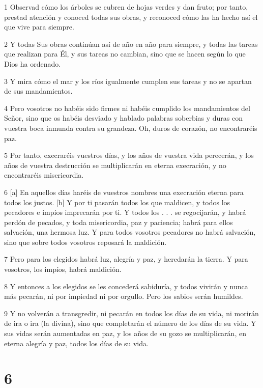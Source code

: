 \par 1 Observad cómo los árboles se cubren de hojas verdes y dan fruto; por tanto, prestad atención y conoced todas sus obras, y reconoced cómo las ha hecho así el que vive para siempre.
\par 2 Y todas Sus obras continúan así de año en año para siempre, y todas las tareas que realizan para Él, y sus tareas no cambian, sino que se hacen según lo que Dios ha ordenado.
\par 3 Y mira cómo el mar y los ríos igualmente cumplen sus tareas y no se apartan de sus mandamientos.
\par 4 Pero vosotros no habéis sido firmes ni habéis cumplido los mandamientos del Señor, sino que os habéis desviado y hablado palabras soberbias y duras con vuestra boca inmunda contra su grandeza. Oh, duros de corazón, no encontraréis paz.
\par 5 Por tanto, execraréis vuestros días, y los años de vuestra vida perecerán, y los años de vuestra destrucción se multiplicarán en eterna execración, y no encontraréis misericordia.
\par 6 [a] En aquellos días haréis de vuestros nombres una execración eterna para todos los justos. [b] Y por ti pasarán todos los que maldicen, y todos los pecadores e impíos imprecarán por ti. Y todos los . . . se regocijarán, y habrá perdón de pecados, y toda misericordia, paz y paciencia; habrá para ellos salvación, una hermosa luz. Y para todos vosotros pecadores no habrá salvación, sino que sobre todos vosotros reposará la maldición.
\par 7 Pero para los elegidos habrá luz, alegría y paz, y heredarán la tierra. Y para vosotros, los impíos, habrá maldición.
\par 8 Y entonces a los elegidos se les concederá sabiduría, y todos vivirán y nunca más pecarán, ni por impiedad ni por orgullo. Pero los sabios serán humildes.
\par 9 Y no volverán a transgredir, ni pecarán en todos los días de su vida, ni morirán de ira o ira (la divina), sino que completarán el número de los días de su vida. Y sus vidas serán aumentadas en paz, y los años de su gozo se multiplicarán, en eterna alegría y paz, todos los días de su vida.

\chapter{6}

